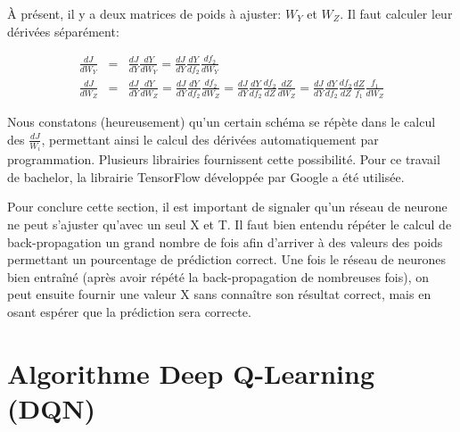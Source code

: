 \documentclass[11pt,a4paper]{report}
\begin{document}
    \par À présent, il y a deux matrices de poids à ajuster: $W_Y$ et $W_Z$. Il faut calculer leur dérivées séparément: 
    
    \begin{eqnarray}
    \frac{dJ}{dW_Y} &=& \frac{dJ}{dY} \frac{dY}{dW_Y} = \frac{dJ}{dY} \frac{dY}{df_2}\frac{df_2}{dW_Y} \\
    \frac{dJ}{dW_Z} &=& \frac{dJ}{dY} \frac{dY}{dW_Z} = \frac{dJ}{dY} \frac{dY}{df_2}\frac{df_2}{dW_Z} = \frac{dJ}{dY} \frac{dY}{df_2}\frac{df_2}{dZ}\frac{dZ}{dW_Z} = \frac{dJ}{dY} \frac{dY}{df_2}\frac{df_2}{dZ} \frac{dZ}{f_1}\frac{f_1}{dW_Z} 
    \end{eqnarray}

    \par Nous constatons (heureusement) qu'un certain schéma se répète dans le calcul des $\frac{dJ}{W_i}$, permettant ainsi le calcul des dérivées automatiquement par programmation. Plusieurs librairies fournissent cette possibilité. Pour ce travail de bachelor, la librairie TensorFlow développée par Google a été utilisée. 
    
    \par Pour conclure cette section, il est important de signaler qu'un réseau de neurone ne peut s'ajuster qu'avec un seul X et T. Il faut bien entendu répéter le calcul de back-propagation un grand nombre de fois afin d'arriver à des valeurs des poids permettant un pourcentage de prédiction correct. Une fois le réseau de neurones bien entraîné (après avoir répété la back-propagation de nombreuses fois), on peut ensuite fournir une valeur X sans connaître son résultat correct, mais en osant espérer que la prédiction sera correcte. 
  
  \section{Algorithme Deep Q-Learning (DQN)}
  
\end{document}
